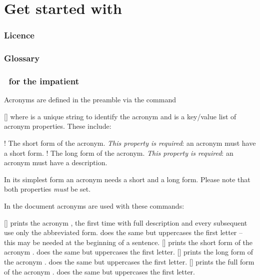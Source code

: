 \documentclass{acro-manual}
\begin{document}
\clearpage
\part{Get started with \acro}\label{part:get-started-with}

\section{Licence}\label{sec:licence}
\license

\section{Glossary}
\printacronyms[include=glossary,template=glossary]

\section{\acro\ for the impatient}\label{sec:acro-impatient}

Acronyms are defined in the preamble via the command
\begin{commands}
  []
    where  is a unique string to identify the acronym and
     is a key\slash value list of acronym properties.  These
    include:
\end{commands}
\begin{properties}
  \Default!
    The short form of the acronym.  \emph{This property is required}: an
    acronym must have a short form.
  \Default!
    The long form of the acronym.  \emph{This property is required}: an
    acronym must have a description.
\end{properties}
\begin{bewareofthedog}
  In its simplest form an acronym needs a short and a long form.  Please note
  that both properties \emph{must} be set.
\end{bewareofthedog}  

In the document acronyms are used with these commands:
\begin{commands}
  [\quad{}]
     prints the acronym , the first time with full description
    and every subsequent use only the abbreviated form.  does the same
    but uppercases the first letter -- this may be needed at the beginning of
    a sentence.
  [\quad{}]
     prints the short form of the acronym .  does the
    same but uppercases the first letter.
  [\quad{}]
     prints the long form of the acronym .  does the
    same but uppercases the first letter.
  [\quad{}]
     prints the full form of the acronym .  does the
    same but uppercases the first letter.
\end{commands}
\end{document}
